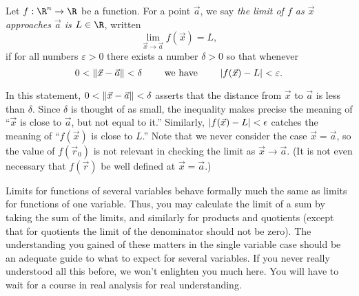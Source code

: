 \begin{definition}[Limit]
	Let $f:\R^n\to \R$ be a function.  For a point $\vec a$,
	we say \emph{the limit of $f$ as $\vec x$ approaches
	$\vec a$ is $L\in\R$}, written
	\[
		\lim_{\vec x\to \vec a}f(\vec x)=L,
	\]
	if for all numbers $\varepsilon>0$ there exists a number
	$\delta >0$ so that whenever
	\[
		0<\lVert\vec x-\vec a\rVert<\delta\qquad\text{ we have }\qquad\lvert f(\vec x)-L\rvert<\varepsilon.
	\]
\end{definition}

In this statement, $0<\lVert\vec x - \vec a\rVert < \delta$ asserts that the distance
from $\vec x$ to $\vec a$ is less than $\delta$.  Since $\delta$ is
thought of as small, the inequality  makes precise the meaning of
``$\vec x$ is close to $\vec a$, but not equal to it.''   Similarly, $\lvert f(\vec x) - L\rvert < 
\epsilon$ catches the meaning of ``$f(\vec x)$ is close to 
$L$.''  Note that we never consider the case $\vec x = \vec a$,
so the value of $f(\vec r_0)$
 is not relevant in checking the limit as $\vec x \to \vec a$.
(It is not even necessary that $f(\vec r)$  be well defined at
$\vec x = \vec a$.)

Limits for functions of several variables behave formally much
the same as limits for functions of one variable.  Thus, you
may calculate the limit of a sum by taking the sum of the
limits, and similarly for products and quotients (except that
for quotients the limit of the denominator should not be zero).
The understanding you gained of these matters in the single
variable case should be an adequate guide to what to expect
for several variables.  If you never really understood all this
before, we won't enlighten you much here.  You will have to
wait for a course in real analysis for real understanding.

